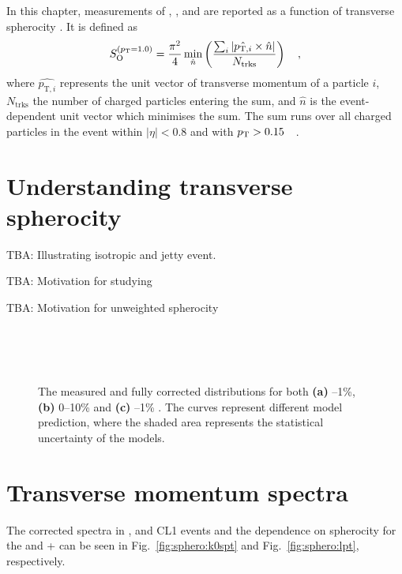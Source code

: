 \def \imgpath {"./figures/sphero"}
In this chapter, measurements of \KOs, \LA, and \AL are reported as a function of transverse spherocity \SOPT. It is defined as
\begin{align}
S_{\text{O}}^{(p_{\text{T}} = 1.0)} = \frac{\pi^2}{4} \min_{\hat{n}} \left(\frac{\sum_i
      |\hat{p_{\textrm{T},i}} \times \hat{n}|}{N_{\textrm{trks}}}  \right) \quad ,
\end{align}
where $\hat{p_{\textrm{T},i}}$ represents the unit vector of transverse momentum of a particle $i$, $N_{\textrm{trks}}$ the number of charged particles entering the sum, and $\hat{n}$ is the event-dependent unit vector which minimises the sum. The sum runs over all charged particles in the event within $|\eta|<0.8$ and with $p_{\text{T}} > 0.15$~\gevc \ .
\section{Understanding transverse spherocity}

TBA: Illustrating isotropic and jetty event.

TBA: Motivation for studying \SOPT

TBA: Motivation for unweighted spherocity

\begin{figure}%
\\
\\
\\
\caption{The measured and fully corrected \SOPT distributions for both \textbf{(a)} --1\%, \textbf{(b)} 0--10\% and \textbf{(c)} --1\% . The curves represent different model prediction, where the shaded area represents the statistical uncertainty of the models.}
\label{fig:sphero:sopt}
\end{figure}

\section{Transverse momentum spectra}

The corrected spectra in \VOM, and CL1 events and the dependence on spherocity for the \KOs and \LA + \AL can be seen in Fig.~\ref{fig:sphero:k0spt} and Fig.~\ref{fig:sphero:lpt}, respectively.

